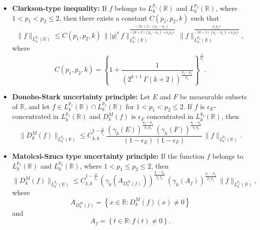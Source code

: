 \documentclass[12pt,a4paper,reqno]{amsproc}
\theoremstyle{definition}
\theoremstyle{remark}
\numberwithin{equation}{section}
\begin{document}
\begin{itemize}
\begin{eqnarray*}
\|D_k^M(f)\|_{L_k^{q_2}(\mathbb{R})} &\le&  C(q_1,q_2,k,b)\, \||x|^s\, D_k^M(f)\|_{L_k^{q_2}(\mathbb{R})}^{\frac{(2k+2)\,(q_1-q_2)}{(2k+2)\,(q_1-q_2)+sq_1q_2}}\\ &&\times \, \|f\|^{\frac{sq_1q_2}{(2k+2)\,(q_1-q_2)+sq_1q_2}}_{L_k^{p_1}(\mathbb{R})}, \quad\text{for some }\,\, s>0,
\end{eqnarray*}
 and
\begin{equation*}
 C(q_1,q_2,k,b) = \left\{ 1+\left(\frac{1}{2^{k+1}\,\Gamma(k+2) }\right)^{\frac{q_1-q_2}{q_1}}\, C_{k,b}^{(1-\frac{2}{q_1})q_2}\right\} ^{\frac{1}{q_{2}}}.  
\end{equation*}
\item {\textbf{Clarkson-type inequality:}} If $f$ belongs to $ L_k^{p_1}(\mathbb{R})$ and $ L_k^{p_2}(\mathbb{R}) $, where $1<p_1<p_2\le 2$, then there exists a constant $C(p_1,p_2,k)$ such that 
\begin{equation*}
    \|f\|_{L_k^{p_1}(\mathbb{R})} \le C(p_1,p_2,k)\, \||y|^s\,f\|^{\frac{(2k+2)\,(p_2-p_1)}{(2k+2)(p_2-p_1)+p_1p_2s}}_{L_k^{p_1}(\mathbb{R})}\, \|f\|_{L_k^{p_2}(\mathbb{R})}^{\frac{p_1p_2s}{(2k+2)(p_2-p_1)+p_1p_2s}},
\end{equation*}
where
\begin{equation*}
  C(p_1,p_2,k) = \left\{ 1+\frac{1}{(2^{k+1}\,\Gamma(k+2))^{\frac{p_2-p_1}{p_2}}}\right\}^{\frac{1}{p_1}}.  
\end{equation*}
\item {\textbf{Donoho-Stark uncertainty principle:}}  Let $E$ and $F$ be measurable subsets of $\mathbb{R}$, and let $ f\in L_k^{p_1}(\mathbb{R})\cap L^{p_2}_k(\mathbb{R})$ for $1<p_1<p_2\le 2$. If $f$ is $\epsilon_E$-concentrated in $L_k^{p_1}(\mathbb{R})$ and $D_k^M(f)$ is $\epsilon_{F}$ concentrated in $L_k^{q_2}(\mathbb{R})$, then 
  \begin{equation*}
      \|D_k^M(f)\|_{L_k^{q_2}(\mathbb{R})} \le C_{k,b}^{1-\frac{2}{q_1}}\, \frac{(\gamma_k(E))^{\frac{p_2-p_1}{p_1\,p_2}}\, (\gamma_k(F))^{\frac{q_1-q_2}{q_1\,q_2}}}{(1-\epsilon_E)\,(1-\epsilon_{F})}\, \|f\|_{L_k^{p_2}(\mathbb{R})}.
  \end{equation*}
  \item {\textbf{Matolcsi-Szucs type uncertainty principle:}} If the function  $f$ belongs to $ L_k^{p_1}(\mathbb{R})$ and $L_k^{p_2}(\mathbb{R})$,  where $1<p_1\le p_2 \le 2$, then 
\begin{equation*}
     \|D_k^M(f)\|_{L_k^{q_2}(\mathbb{R})} \le C_{k,b}^{1-\frac{2}{q_1}}\, (\gamma_k(A_{D_k^M(f)}))^{\frac{q_1-q_2}{q_1\,q_2}}\, (\gamma_k(A_f))^{\frac{p_1-p_2}{p_1\,p_2}}\, \|f\|_{L^{p_2}_k(\mathbb{R})},
\end{equation*}
where $$A_{D_k^M(f)}= \left\{x\in \mathbb{R}: D_k^M(f)(x) \neq 0\right\}$$ and $$A_f = \left\{ t
\in \mathbb{R}:f(t)\neq0\right\}.$$


\end{itemize}
\end{document}

